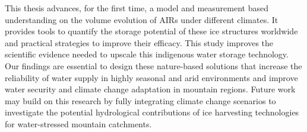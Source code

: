 This thesis advances, for the first time, a model and measurement based understanding on the volume evolution of AIRs under different climates. It
provides tools to quantify the storage potential of these ice structures worldwide and practical strategies to
improve their efficacy. This study improves the scientific evidence needed to upscale this indigenous water
storage technology. Our findings are essential to design these nature-based solutions that increase the
reliability of water supply in highly seasonal and arid environments and improve water security and climate
change adaptation in mountain regions. Future work may build on this research by fully integrating climate
change scenarios to investigate the potential hydrological contributions of ice harvesting technologies for
water-stressed mountain catchments.

